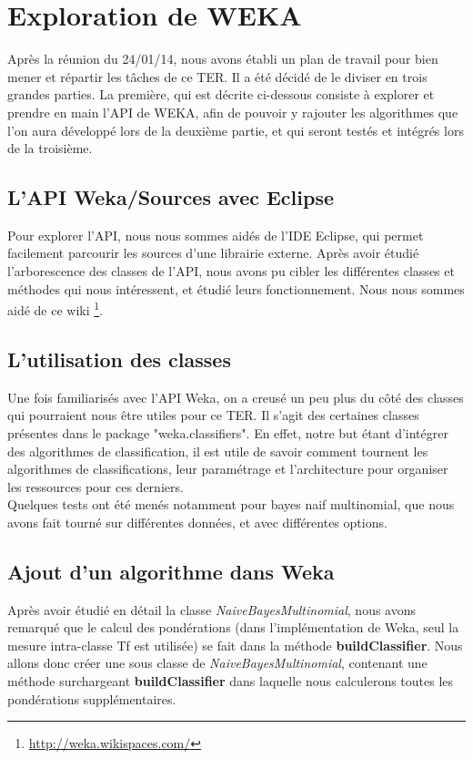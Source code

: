 \documentclass{article}
\begin{document}

\section{Exploration de WEKA}
Après la réunion du 24/01/14, nous avons établi un plan de travail pour bien mener et répartir les tâches de ce TER. Il a été décidé de le diviser en trois grandes parties. La première, qui est décrite ci-dessous consiste à explorer et prendre en main l'API de WEKA, afin de pouvoir y rajouter les algorithmes que l'on aura développé lors de la deuxième partie, et qui seront testés et intégrés lors de la troisième.
\subsection{L'API Weka/Sources avec Eclipse}
Pour explorer l'API, nous nous sommes aidés de l'IDE Eclipse, qui permet facilement parcourir les sources d'une librairie externe. Après avoir étudié l'arborescence des classes de l'API, nous avons pu cibler les différentes classes et méthodes qui nous intéressent, et étudié leurs fonctionnement. Nous nous sommes aidé de ce wiki \footnote{\href{http://weka.wikispaces.com/}{http://weka.wikispaces.com/}}.

\subsection{L'utilisation des classes}
Une fois familiarisés avec l'API Weka, on a creusé un peu plus du côté des classes qui pourraient nous être utiles pour ce TER. Il s'agit des certaines classes présentes dans le package{\scriptsize { \normalsize "weka.classifiers"}}. En effet, notre but étant d'intégrer des algorithmes de classification, il est utile de savoir comment tournent les algorithmes de classifications, leur paramétrage et l'architecture pour organiser les ressources pour ces derniers.\\
Quelques tests ont été menés notamment pour bayes naif multinomial, que nous avons fait tourné sur différentes données, et avec différentes options.
\subsection{Ajout d'un algorithme dans Weka}
Après avoir étudié en détail la classe \textit{NaiveBayesMultinomial}, nous avons remarqué que le calcul des pondérations (dans l'implémentation de Weka, seul la mesure intra-classe Tf est utilisée) se fait dans la méthode \textbf{buildClassifier}. Nous allons donc créer une sous classe de \textit{NaiveBayesMultinomial}, contenant une méthode surchargeant \textbf{buildClassifier} dans laquelle nous calculerons toutes les pondérations supplémentaires.
\end{document}

